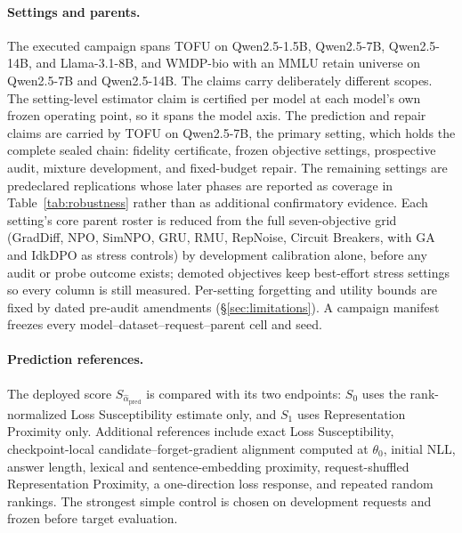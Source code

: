 \paragraph{Settings and parents.}
The executed campaign spans TOFU \cite{maini2024tofu} on Qwen2.5-1.5B,
Qwen2.5-7B, Qwen2.5-14B, and Llama-3.1-8B, and WMDP-bio with an MMLU retain
universe \cite{li2024wmdp,hendrycks2021measuring} on Qwen2.5-7B and
Qwen2.5-14B. The claims carry deliberately different scopes. The
setting-level estimator claim is certified per model at each model's own
frozen operating point, so it spans the model axis. The prediction and
repair claims are carried by TOFU on Qwen2.5-7B, the primary setting, which
holds the complete sealed chain: fidelity certificate, frozen objective
settings, prospective audit, mixture development, and fixed-budget repair.
The remaining settings are predeclared replications whose later phases are
reported as coverage in Table~\ref{tab:robustness} rather than as
additional confirmatory evidence. Each
setting's core parent roster is reduced from the full seven-objective grid
(GradDiff, NPO, SimNPO, GRU, RMU, RepNoise, Circuit Breakers, with GA and
IdkDPO as stress controls) by development calibration alone, before any
audit or probe outcome exists; demoted objectives keep best-effort stress
settings so every column is still measured. Per-setting forgetting and
utility bounds are fixed by dated pre-audit amendments
(\S\ref{sec:limitations}). A campaign manifest freezes every
model--dataset--request--parent cell and seed.

\paragraph{Prediction references.}
The deployed score $S_{\widehat\alpha_{\mathrm{pred}}}$ is compared with its
two endpoints: $S_0$ uses the rank-normalized Loss Susceptibility
estimate only, and $S_1$ uses Representation Proximity only. Additional references include exact
Loss Susceptibility, checkpoint-local candidate--forget-gradient
alignment computed at $\theta_0$, initial NLL, answer length, lexical and
sentence-embedding proximity, request-shuffled
Representation Proximity, a one-direction loss response, and repeated random
rankings. The strongest simple control is chosen on development requests and
frozen before target evaluation.

